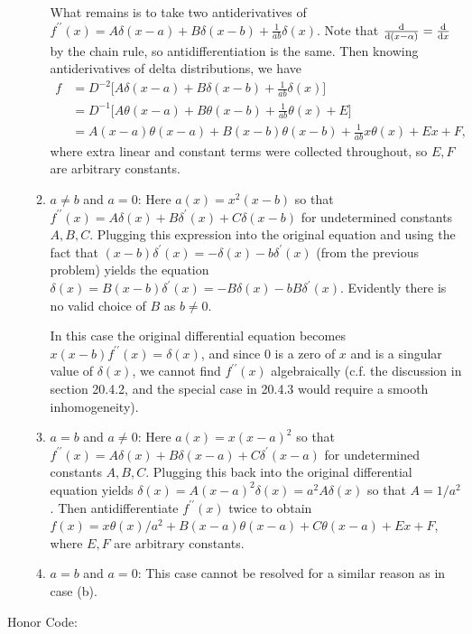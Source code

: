 \documentclass[11pt]{article}
\begin{document}
\begin{enumerate}
\begin{enumerate}
        What remains is to take two antiderivatives of $f^{\prime\prime}(x) = A\delta(x-a) + B\delta(x-b) + \frac{1}{ab}\delta(x)$. Note that $\dv{(x-\alpha)} = \dv{x}$ by the chain rule, so antidifferentiation is the same. Then knowing antiderivatives of delta distributions, we have \begin{align*}
            f &= D^{-2}\bigg[A\delta(x-a) + B\delta(x-b) + \frac{1}{ab}\delta(x)\bigg]\\
            &=D^{-1}\bigg[A\theta(x-a)+B\theta(x-b) + \frac{1}{ab}\theta(x) + E\bigg]\\
            &=A(x-a)\theta(x-a) + B(x-b)\theta(x-b) + \frac{1}{ab}x\theta(x) + Ex + F,
        \end{align*} where extra linear and constant terms were collected throughout, so $E,F$ are arbitrary constants.

        \item $a\neq b$ and $a= 0$:
        Here $a(x) = x^2(x-b)$ so that $f^{\prime\prime}(x) = A\delta(x) + B\delta^{\prime}(x) + C\delta(x-b)$ for undetermined constants $A,B,C$. Plugging this expression into the original equation and using the fact that $(x-b)\delta^\prime(x) = -\delta(x)-b\delta^\prime(x)$ (from the previous problem) yields the equation $\delta(x) = B(x-b)\delta^{\prime}(x) = -B\delta(x)-bB\delta^\prime(x)$. Evidently there is no valid choice of $B$ as $b\neq 0$.

        In this case the original differential equation becomes $x(x-b)f^{\prime\prime}(x) = \delta(x)$, and since $0$ is a zero of $x$ and is a singular value of $\delta(x)$, we cannot find $f^{\prime\prime}(x)$ algebraically (c.f. the discussion in section 20.4.2, and the special case in 20.4.3 would require a smooth inhomogeneity).

        \item $a=b$ and $a\neq 0$: Here $a(x) = x(x-a)^2$ so that $f^{\prime\prime}(x) = A\delta(x) + B\delta(x-a) + C\delta^\prime(x-a)$ for undetermined constants $A,B,C$. Plugging this back into the original differential equation yields $\delta(x) = A(x-a)^2\delta(x) = a^2A\delta(x)$ so that $A = 1/a^2$. Then antidifferentiate $f^{\prime\prime}(x)$ twice to obtain $f(x) = x\theta(x)/a^2 + B(x-a)\theta(x-a) + C\theta(x-a) + Ex+ F$, where $E,F$ are arbitrary constants.
        
        \item $a=b$ and $a = 0$: This case cannot be resolved for a similar reason as in case (b).
        
        
    \end{enumerate}

    \hrulefill

\end{enumerate}
Honor Code: \vspace*{7em}
\end{document}
